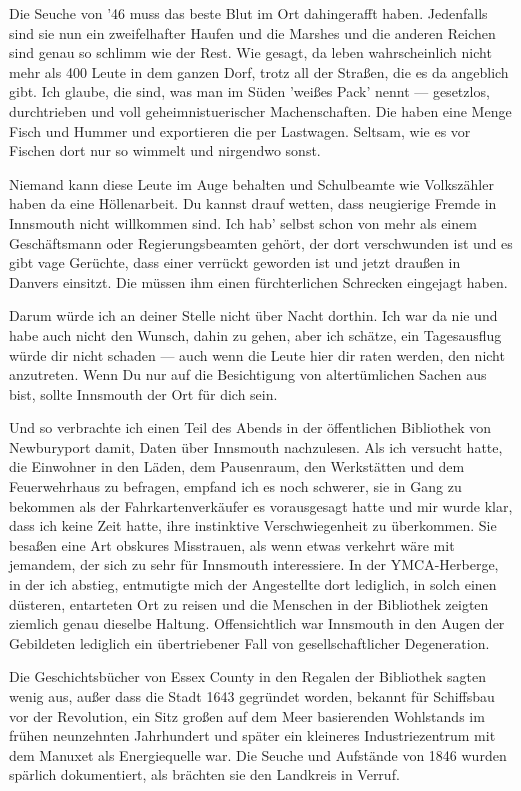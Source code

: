 Die Seuche von '46 muss das beste Blut im Ort dahingerafft haben. Jedenfalls sind sie nun ein zweifelhafter Haufen und die Marshes und die anderen Reichen sind genau so schlimm wie der Rest. Wie gesagt, da leben wahrscheinlich nicht mehr als 400 Leute in dem ganzen Dorf, trotz all der Straßen, die es da angeblich gibt. Ich glaube, die sind, was man im Süden 'weißes Pack' nennt --- gesetzlos, durchtrieben und voll geheimnistuerischer Machenschaften. Die haben eine Menge Fisch und Hummer und exportieren die per Lastwagen. Seltsam, wie es vor Fischen dort nur so wimmelt und nirgendwo sonst.

Niemand kann diese Leute im Auge behalten und Schulbeamte wie Volkszähler haben da eine Höllenarbeit. Du kannst drauf wetten, dass neugierige Fremde in Innsmouth nicht willkommen sind. Ich hab' selbst schon von mehr als einem Geschäftsmann oder Regierungsbeamten gehört, der dort verschwunden ist und es gibt vage Gerüchte, dass einer verrückt geworden ist und jetzt draußen in Danvers einsitzt. Die müssen ihm einen fürchterlichen Schrecken eingejagt haben.

Darum würde ich an deiner Stelle nicht über Nacht dorthin. Ich war da nie und habe auch nicht den Wunsch, dahin zu gehen, aber ich schätze, ein Tagesausflug würde dir nicht schaden --- auch wenn die Leute hier dir raten werden, den nicht anzutreten. Wenn Du nur auf die Besichtigung von altertümlichen Sachen aus bist, sollte Innsmouth der Ort für dich sein.\grqq

Und so verbrachte ich einen Teil des Abends in der öffentlichen Bibliothek von Newburyport damit, Daten über Innsmouth nachzulesen. Als ich versucht hatte, die Einwohner in den Läden, dem Pausenraum, den Werkstätten und dem Feuerwehrhaus zu befragen, empfand ich es noch schwerer, sie in Gang zu bekommen als der Fahrkartenverkäufer es vorausgesagt hatte und mir wurde klar, dass ich keine Zeit hatte, ihre instinktive Verschwiegenheit zu überkommen. Sie besaßen eine Art obskures Misstrauen, als wenn etwas verkehrt wäre mit jemandem, der sich zu sehr für Innsmouth interessiere. In der YMCA-Herberge, in der ich abstieg, entmutigte mich der Angestellte dort lediglich, in solch einen düsteren, entarteten Ort zu reisen und die Menschen in der Bibliothek zeigten ziemlich genau dieselbe Haltung. Offensichtlich war Innsmouth in den Augen der Gebildeten lediglich ein übertriebener Fall von gesellschaftlicher Degeneration.

Die Geschichtsbücher von Essex County in den Regalen der Bibliothek sagten wenig aus, außer dass die Stadt 1643 gegründet worden, bekannt für Schiffsbau vor der Revolution, ein Sitz großen auf dem Meer basierenden Wohlstands im frühen neunzehnten Jahrhundert und später ein kleineres Industriezentrum mit dem Manuxet als Energiequelle war. Die Seuche und Aufstände von 1846 wurden spärlich dokumentiert, als brächten sie den Landkreis in Verruf.

